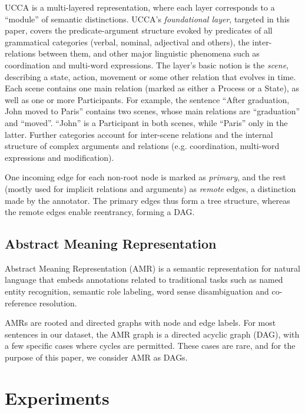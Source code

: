 \documentclass[11pt,a4paper]{article}
\begin{document}
UCCA is a multi-layered representation, where each layer corresponds
to a ``module'' of semantic distinctions.
UCCA's \textit{foundational layer}, targeted in this paper, covers the predicate-argument
structure evoked by predicates of all grammatical categories
(verbal, nominal, adjectival and others), the inter-relations between them,
and other major linguistic phenomena such as coordination and multi-word expressions.
The layer's basic notion is the \textit{scene},
describing a state, action, movement or some other relation that evolves in time.
Each scene contains one main relation (marked as either a Process or a State),
as well as one or more Participants.
For example, the sentence ``After graduation, John moved to Paris''
contains two scenes, whose main relations are ``graduation'' and ``moved''.
``John'' is a Participant in both scenes, while ``Paris'' only in the latter.
Further categories account for inter-scene relations and the internal structure of
complex arguments and relations (e.g. coordination, multi-word expressions and modification).

One incoming edge for each non-root node is marked as \textit{primary},
and the rest (mostly used for implicit relations and arguments) as \textit{remote} edges,
a distinction made by the annotator.
The primary edges thus form a tree structure, whereas the remote edges enable reentrancy,
forming a DAG.

\subsection{Abstract Meaning Representation}

Abstract Meaning Representation (AMR)
is a semantic representation for natural
language that embeds annotations related
to traditional tasks such as named entity
recognition, semantic role labeling, word
sense disambiguation and co-reference
resolution.

AMRs are rooted and directed
graphs with node and edge labels.
For most sentences in our dataset, the
AMR graph is a directed acyclic graph (DAG),
with a few specific cases where cycles are permitted.
These cases are rare, and for the purpose of
this paper, we consider AMR as DAGs.



\section{Experiments}\label{sec:experiments}
\end{document}
